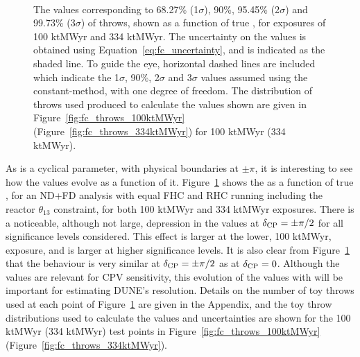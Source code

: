 \begin{figure}[htbp]
  \centering
  \\
  \caption{The \dchisqcrit values corresponding to 68.27\% (1$\sigma$), 90\%, 95.45\% (2$\sigma$) and 99.73\% (3$\sigma$) of throws, shown as a function of true \deltacp, for exposures of 100 ktMWyr and 334 ktMWyr. The uncertainty on the \dchisqcrit values is obtained using Equation~\ref{eq:fc_uncertainty}, and is indicated as the shaded line. To guide the eye, horizontal dashed lines are included which indicate the 1$\sigma$, 90\%, 2$\sigma$ and 3$\sigma$ \dchisq values assumed using the constant-\dchisq method, with one degree of freedom. The distribution of throws used produced to calculate the \dchisqcrit values shown are given in Figure~\ref{fig:fc_throws_100ktMWyr} (Figure~\ref{fig:fc_throws_334ktMWyr}) for 100 ktMWyr (334 ktMWyr).}
  \label{fig:fc_vs_dcp}
\end{figure}
As \deltacp is a cyclical parameter, with physical boundaries at $\pm\pi$, it is interesting to see how the \dchisqcrit values evolve as a function of it. Figure~\ref{fig:fc_vs_dcp} shows the \dchisqcrit as a function of true \deltacp, for an ND+FD analysis with equal FHC and RHC running including the reactor $\theta_{13}$ constraint, for both 100 ktMWyr and 334 ktMWyr exposures. There is a noticeable, although not large, depression in the \dchisqcrit values at $\delta_{\rm CP} = \pm\pi/2$ for all significance levels considered. This effect is larger at the lower, 100 ktMWyr, exposure, and is larger at higher significance levels. It is also clear from Figure~\ref{fig:fc_vs_dcp} that the \dchisqcrit behaviour is very similar at $\delta_{\rm CP} = \pm\pi/2$ as at $\delta_{\rm CP} = 0$. Although the \dchisqcrit values are relevant for CPV sensitivity, this evolution of the \dchisqcrit values with \deltacp will be important for estimating DUNE's \deltacp resolution. Details on the number of toy throws used at each point of Figure~\ref{fig:fc_vs_dcp} are given in the Appendix, and the toy throw distributions used to calculate the \dchisqcrit values and uncertainties are shown for the 100 ktMWyr (334 ktMWyr) test points in Figure~\ref{fig:fc_throws_100ktMWyr} (Figure~\ref{fig:fc_throws_334ktMWyr}).

